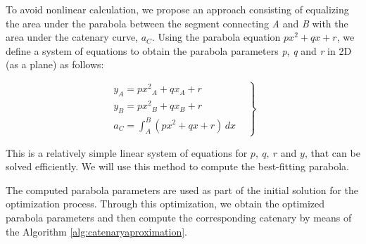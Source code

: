 To avoid nonlinear calculation, we propose an approach consisting of equalizing the area under the parabola between the segment connecting \emph{A} and \emph{B} with the area under the catenary curve, $a_C$. Using the parabola equation $px^2+qx+r$, we define a system of equations to obtain the parabola parameters \emph{p}, \emph{q} and \emph{r} in 2D (as a plane) as follows:




\begin{equation}
    \label{eq:parabola_4}
    \left.
        \begin{array}{lll}
            y_A = p{x^2}_A + qx_A + r & \\
            y_B = p{x^2}_B + qx_B + r & \\
             a_C =  \int_{A}^{B} (px^2 + qx + r)  \,dx       
        \end{array}
        \right\}
\end{equation}

\noindent This is a relatively simple linear system of equations for $p,\ q,\ r$ and $y$, that can be solved efficiently. We will use this method to compute the best-fitting parabola.

The computed parabola parameters are used as part of the initial solution for the optimization process. Through this optimization, we obtain the optimized parabola parameters and then compute the corresponding catenary by means of the Algorithm \ref{alg:catenaryaproximation}. 

